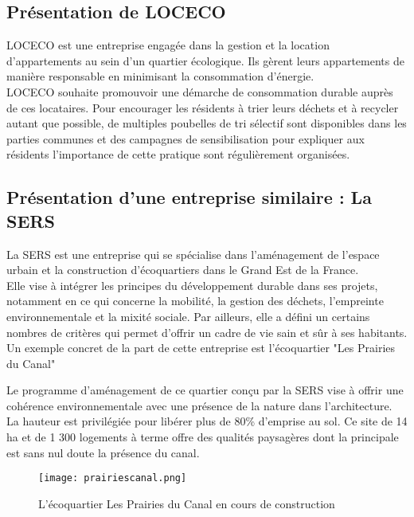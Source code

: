 \subsection{Présentation de LOCECO}

LOCECO est une entreprise engagée dans la gestion et la location d’appartements au sein d’un quartier écologique. Ils gèrent leurs appartements de manière responsable en minimisant la consommation d’énergie.\\

LOCECO souhaite promouvoir une démarche de consommation durable auprès de ces locataires. Pour encourager les résidents à trier leurs déchets et à recycler autant que possible, de multiples poubelles de tri sélectif sont disponibles dans les parties communes et des campagnes de sensibilisation pour expliquer aux résidents l'importance de cette pratique sont régulièrement organisées.

\subsection{Présentation d'une entreprise similaire : La SERS}

La SERS est une entreprise qui se spécialise dans l'aménagement de l'espace urbain et la construction d'écoquartiers dans le Grand Est de la France.\\

Elle vise à intégrer les principes du développement durable dans ses projets, notamment en ce qui concerne la mobilité, la gestion des déchets, l'empreinte environnementale et la mixité sociale. Par ailleurs, elle a défini un certains nombres de critères qui permet d’offrir un cadre de vie sain et sûr à ses habitants.\\

Un exemple concret de la part de cette entreprise est l'écoquartier "Les Prairies du Canal"

Le programme d’aménagement de ce quartier conçu par la SERS vise à offrir une cohérence environnementale avec une présence de la nature dans l’architecture. La hauteur est privilégiée pour libérer plus de 80\% d’emprise au sol. Ce site de 14 ha et de 1 300 logements à terme offre des qualités paysagères dont la principale est sans nul doute la présence du canal.

\begin{figure}[!h]
\begin{center}
\texttt{[image: prairiescanal.png]}
\end{center}
\caption{L'écoquartier Les Prairies du Canal en cours de construction}
\end{figure}





